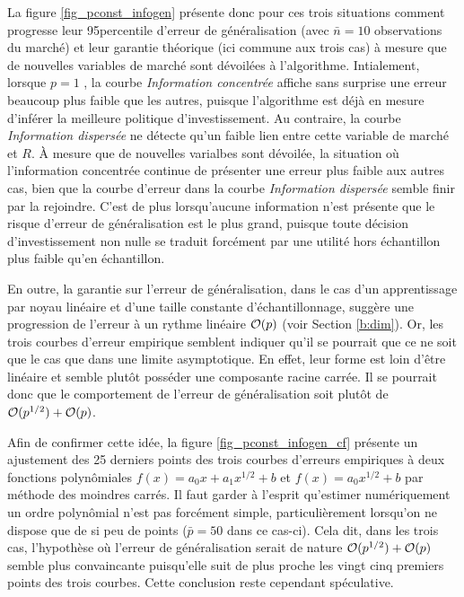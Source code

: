 La figure \ref{fig_pconst_infogen} présente donc pour ces trois situations comment
progresse leur 95\ieme percentile d'erreur de généralisation (avec $\bar n = 10$
observations du marché) et leur garantie théorique (ici commune aux trois cas) à mesure
que de nouvelles variables de marché sont dévoilées à l'algorithme. Intialement, lorsque
$p=1$ , la courbe \textit{Information concentrée} affiche sans surprise une erreur
beaucoup plus faible que les autres, puisque l'algorithme est déjà en mesure d'inférer la
meilleure politique d'investissement. Au contraire, la courbe \textit{Information
  dispersée} ne détecte qu'un faible lien entre cette variable de marché et $R$. À mesure
que de nouvelles varialbes sont dévoilée, la situation où l'information concentrée
continue de présenter une erreur plus faible aux autres cas, bien que la courbe d'erreur
dans la courbe \textit{Information dispersée} semble finir par la rejoindre. C'est de plus
lorsqu'aucune information n'est présente que le risque d'erreur de généralisation est le
plus grand, puisque toute décision d'investissement non nulle se traduit forcément par une
utilité hors échantillon plus faible qu'en échantillon.

En outre, la garantie sur l'erreur de généralisation, dans le cas d'un apprentissage par
noyau linéaire et d'une taille constante d'échantillonnage, suggère une progression de
l'erreur à un rythme linéaire $\mathcal O(p)$ (voir Section \ref{b:dim}). Or, les trois courbes
d'erreur empirique semblent indiquer qu'il se pourrait que ce ne soit que le cas que dans
une limite asymptotique. En effet, leur forme est loin d'être linéaire et semble plutôt
posséder une composante racine carrée. Il se pourrait donc que le comportement de l'erreur
de généralisation soit plutôt de $\mathcal O(p^{1/2}) + \mathcal O(p)$.

Afin de confirmer cette idée, la figure \ref{fig_pconst_infogen_cf} présente un ajustement
des 25 derniers points des trois courbes d'erreurs empiriques à deux fonctions
polynômiales $f(x) = a_0x + a_1x^{1/2} + b$ et $f(x) = a_0x^{1/2} + b$ par méthode des
moindres carrés. Il faut garder à l'esprit qu'estimer numériquement un ordre polynômial
n'est pas forcément simple, particulièrement lorsqu'on ne dispose que de si peu de points
($\bar p = 50$ dans ce cas-ci). Cela dit, dans les trois cas, l'hypothèse où l'erreur de
généralisation serait de nature $\mathcal O(p^{1/2}) + \mathcal O(p)$ semble plus convaincante
puisqu'elle suit de plus proche les vingt cinq premiers points des trois courbes. Cette
conclusion reste cependant spéculative.

